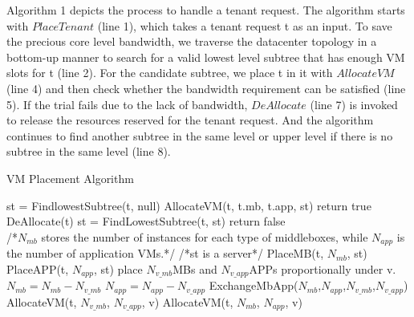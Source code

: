 \documentclass[review]{elsarticle}
\begin{document}
Algorithm 1 depicts the process to handle a tenant request. The algorithm starts with $PlaceTenant$ (line 1), which takes a tenant request t as an input. To save the precious core level bandwidth, we traverse the datacenter topology in a bottom-up manner to search for a valid lowest level subtree that has enough VM slots for t (line 2). For the candidate subtree, we place t in it with $AllocateVM$ (line 4) and then check whether the bandwidth requirement can be satisfied (line 5). If the trial fails due to the lack of bandwidth, $DeAllocate$ (line 7) is invoked to release the resources reserved for the tenant request. And the algorithm continues to find another subtree in the same level or upper level if there is no subtree in the same level (line 8). 
\begin{algorithm}[!htbp]
	\caption{VM Placement Algorithm}
	\label{alg1}
	\begin{algorithmic}[1]
		\State st = FindlowestSubtree(t, null)
		   \State AllocateVM(t, t.mb, t.app, st)
			   \State return true
		   \EndIf 
		   \State DeAllocate(t)
		   \State st = FindLowestSubtree(t, st)
		\EndWhile
		\State return false
	  \EndFunction
	  \\
	  /*$N_{mb}$ stores the number of instances for each type of middleboxes, while $N_{app}$ is the number of application VMs.*/
	   /*st is a server*/
		  \State PlaceMB(t, $N_{mb}$, st)
		  \State PlaceAPP(t, $N_{app}$, st)
	  \Else
				  \State place $N_{v\_mb}$MBs and $N_{v\_app}$APPs \State proportionally under v.
				  \State $N_{mb} = N_{mb} - N_{v\_mb}$
				  \State $N_{app} = N_{app} - N_{v\_app}$
				  \State ExchangeMbApp($N_{mb}$,$N_{app}$,$N_{v\_mb}$,$N_{v\_app}$)
				  \State AllocateVM(t, $N_{v\_mb}$, $N_{v\_app}$, v)
		      \Else
			      \State AllocateVM(t, $N_{mb}$, $N_{app}$, v)
			  \EndIf
		\EndIf
	  \EndFor
	\EndIf
   \EndFunction %
\end{algorithmic}
\end{algorithm}
\end{document}
